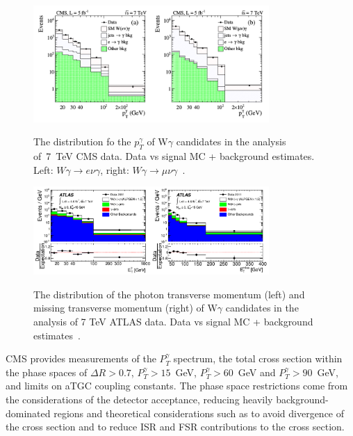 
\begin{figure}[htb]
  \begin{center}
    {\includegraphics[width=0.80\textwidth]{../figs/WgAbout/Wg7TeV_CMS_ptGamma.png}}
    \caption{The distribution fo the $p_T^\gamma$ of W$\gamma$ candidates in the analysis of~7~TeV CMS data. Data vs signal MC + background estimates. Left: $W\gamma\rightarrow e\nu\gamma$, right: $W\gamma\rightarrow \mu\nu\gamma$~\cite{ref_7TeV_CMS}.}
    \label{fig:Wg7TeV_CMS_ptGamma}
  \end{center}
\end{figure}

\begin{figure}[htb]
  \begin{center}
    {\includegraphics[width=0.80\textwidth]{../figs/WgAbout/Wg7TeV_ATLAS_ptGamma.png}}
    \caption{The distribution of the photon transverse momentum (left) and missing transverse momentum (right) of W$\gamma$ candidates in the analysis of 7 TeV ATLAS data. Data vs signal MC + background estimates~\cite{ref_7TeV_ATLAS}. }
    \label{fig:Wg7TeV_ATLAS_ptGamma}
  \end{center}
\end{figure}

CMS provides measurements of the $P_T^\gamma$ spectrum, the total cross section within the phase spaces of $\Delta R>0.7$, $P_T^\gamma>15$~GeV, $P_T^\gamma>60$~GeV and $P_T^\gamma>90$~GeV, and limits on aTGC coupling constants. The phase space restrictions come from the considerations of the detector acceptance, reducing heavily background-dominated regions and theoretical considerations such as to avoid divergence of the cross section and to reduce ISR and FSR contributions to the cross section.\\

